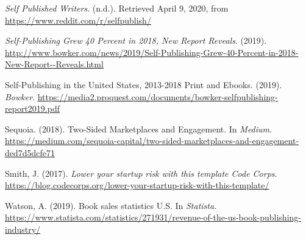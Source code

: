 \documentclass[11pt,openany]{book}
\newlength{\cslhangindent}
\newenvironment{cslreferences}%
  {\setlength{\parindent}{0pt}%
  \everypar{\setlength{\hangindent}{\cslhangindent}}\ignorespaces}%
  {\par}
\begin{document}
\begin{cslreferences}
\leavevmode\hypertarget{ref-noauthor_self_nodate}{}%
\emph{Self Published Writers}. (n.d.). Retrieved April 9, 2020, from
\url{https://www.reddit.com/r/selfpublish/}

\leavevmode\hypertarget{ref-bowker_news_nodate}{}%
\emph{Self-Publishing Grew 40 Percent in 2018, New Report Reveals}.
(2019).
\url{http://www.bowker.com/news/2019/Self-Publishing-Grew-40-Percent-in-2018-New-Report--Reveals.html}

\leavevmode\hypertarget{ref-bowker_self-publishing_2019}{}%
Self-Publishing in the United States, 2013-2018 Print and Ebooks.
(2019). \emph{Bowker}.
\url{https://media2.proquest.com/documents/bowker-selfpublishing-report2019.pdf}

\leavevmode\hypertarget{ref-sequoia_two-sided_2018}{}%
Sequoia. (2018). Two-Sided Marketplaces and Engagement. In
\emph{Medium}.
\url{https://medium.com/sequoia-capital/two-sided-marketplaces-and-engagement-ded7d5dcfe71}

\leavevmode\hypertarget{ref-smith_lower_nodate}{}%
Smith, J. (2017). \emph{Lower your startup risk with this template Code
Corps}.
\url{https://blog.codecorps.org/lower-your-startup-risk-with-this-template/}

\leavevmode\hypertarget{ref-statista_book_2020}{}%
Watson, A. (2019). Book sales statistics U.S. In \emph{Statista}.
\url{https://www.statista.com/statistics/271931/revenue-of-the-us-book-publishing-industry/}
\end{cslreferences}

\end{document}
